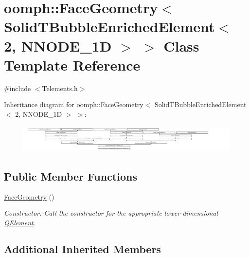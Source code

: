 \hypertarget{classoomph_1_1FaceGeometry_3_01SolidTBubbleEnrichedElement_3_012_00_01NNODE__1D_01_4_01_4}{}\section{oomph\+:\+:Face\+Geometry$<$ Solid\+T\+Bubble\+Enriched\+Element$<$ 2, N\+N\+O\+D\+E\+\_\+1D $>$ $>$ Class Template Reference}
\label{classoomph_1_1FaceGeometry_3_01SolidTBubbleEnrichedElement_3_012_00_01NNODE__1D_01_4_01_4}


{\ttfamily \#include $<$Telements.\+h$>$}

Inheritance diagram for oomph\+:\+:Face\+Geometry$<$ Solid\+T\+Bubble\+Enriched\+Element$<$ 2, N\+N\+O\+D\+E\+\_\+1D $>$ $>$\+:\begin{figure}[H]
\begin{center}
\leavevmode
\includegraphics[height=1.461596cm]{classoomph_1_1FaceGeometry_3_01SolidTBubbleEnrichedElement_3_012_00_01NNODE__1D_01_4_01_4}
\end{center}
\end{figure}
\subsection*{Public Member Functions}
\begin{DoxyCompactItemize}
\item 
\hyperlink{classoomph_1_1FaceGeometry_3_01SolidTBubbleEnrichedElement_3_012_00_01NNODE__1D_01_4_01_4_a057fde1846701a11833f6606a775131b}{Face\+Geometry} ()
\begin{DoxyCompactList}\small\item\em Constructor\+: Call the constructor for the appropriate lower-\/dimensional \hyperlink{classoomph_1_1QElement}{Q\+Element}. \end{DoxyCompactList}\end{DoxyCompactItemize}
\subsection*{Additional Inherited Members}


